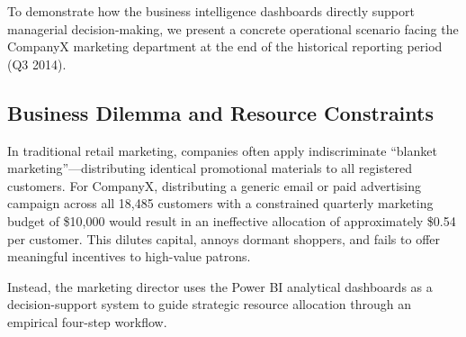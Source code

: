 To demonstrate how the business intelligence dashboards directly support managerial decision-making, we present a concrete operational scenario facing the CompanyX marketing department at the end of the historical reporting period (Q3 2014).

\subsection{Business Dilemma and Resource Constraints}
In traditional retail marketing, companies often apply indiscriminate ``blanket marketing''---distributing identical promotional materials to all registered customers. For CompanyX, distributing a generic email or paid advertising campaign across all 18,485 customers with a constrained quarterly marketing budget of \$10,000 would result in an ineffective allocation of approximately \$0.54 per customer. This dilutes capital, annoys dormant shoppers, and fails to offer meaningful incentives to high-value patrons. 

Instead, the marketing director uses the Power BI analytical dashboards as a decision-support system to guide strategic resource allocation through an empirical four-step workflow.

